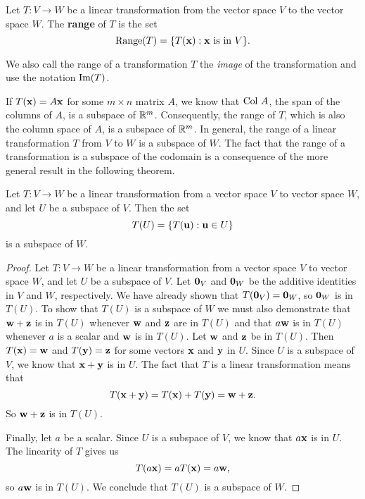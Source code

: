 \begin{definition} Let $T : V \to W$ be a linear transformation from the vector space $V$ to the vector space $W$. The \textbf{range} of $T$ is the set
\[\text{Range}(T) = \{T(\mathbf{x}) : \mathbf{x} \text{ is in } V\}.\]
\end{definition}

We also call the range of a transformation $T$ the \emph{image}  of the transformation and use the notation $\text{Im}(T)$. 

If $T(\mathbf{x}) = A\mathbf{x}$ for some $m \times n$ matrix $A$, we know that $\text{Col } A$, the span of the columns of $A$, is a subspace of $\mathbb{R}^m$. Consequently, the range of $T$, which is also the column space of $A$, is a subspace of $\mathbb{R}^m$. In general, the range of a linear transformation $T$ from $V$ to $W$ is a subspace of $W$. The fact that the range of a transformation is a subspace of the codomain is a consequence of the more general result in the following theorem.

\begin{theorem} Let $T : V \to W$ be a linear transformation from a vector space $V$ to vector space $W$, and let $U$ be a subspace of $V$. Then the set 
\[T(U) = \{T(\mathbf{u}) : \mathbf{u} \in U\}\]
is a subspace of $W$.
\end{theorem}

\begin{proof} Let $T : V \to W$ be a linear transformation from a vector space $V$ to vector space $W$, and let $U$ be a subspace of $V$. Let $\mathbf{0}_V$ and $\mathbf{0}_W$ be the additive identities in $V$ and $W$, respectively. We have already shown that $T(\mathbf{0}_V) = \mathbf{0}_W$, so $\mathbf{0}_W$ is in $T(U)$. To show that $T(U)$ is a subspace of $W$ we must also demonstrate that $\mathbf{w}+\mathbf{z}$ is in $T(U)$ whenever $\mathbf{w}$ and $\mathbf{z}$ are in $T(U)$ and that $a\mathbf{w}$ is in $T(U)$ whenever $a$ is a scalar and $\mathbf{w}$ is in $T(U)$. Let $\mathbf{w}$ and $\mathbf{z}$ be in $T(U)$. Then $T(\mathbf{x}) = \mathbf{w}$ and $T(\mathbf{y}) = \mathbf{z}$ for some vectors $\mathbf{x}$ and $\mathbf{y}$ in $U$. Since $U$ is a subspace of $V$, we know that $\mathbf{x}+\mathbf{y}$ is in $U$. The fact that $T$ is a linear transformation means that
\[T(\mathbf{x} + \mathbf{y}) = T(\mathbf{x}) + T(\mathbf{y}) = \mathbf{w} + \mathbf{z}.\]
So $\mathbf{w}+\mathbf{z}$ is in $T(U)$.

Finally, let $a$ be a scalar. Since $U$ is a subspace of $V$, we know that $a \mathbf{x}$ is in $U$. The linearity of $T$ gives us
\[T(a\mathbf{x}) = aT(\mathbf{x}) = a\mathbf{w},\]
so $a \mathbf{w}$ is in $T(U)$.  We conclude that $T(U)$ is a subspace of $W$.
\end{proof}

